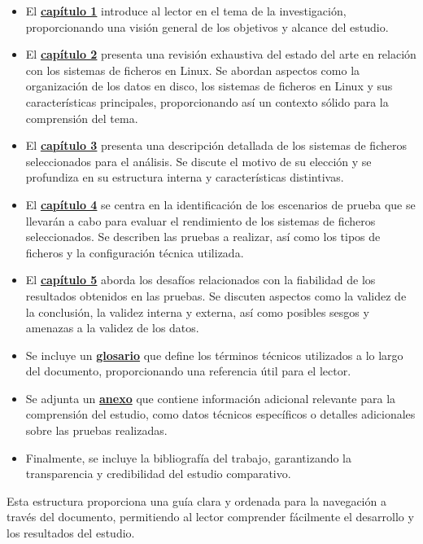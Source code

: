 \begin{itemize}
    \item El \textbf{\hyperref[sec:capítulo_1]{capítulo 1}} introduce al lector en el tema de la investigación, proporcionando una visión general de los objetivos y alcance del estudio.
    
    \item El \textbf{\hyperref[sec:capítulo_2]{capítulo 2}} presenta una revisión exhaustiva del estado del arte en relación con los sistemas de ficheros en Linux. Se abordan aspectos como la organización de los datos en disco, los sistemas de ficheros en Linux y sus características principales, proporcionando así un contexto sólido para la comprensión del tema.
    
    \item El \textbf{\hyperref[sec:capítulo_3]{capítulo 3}} presenta una descripción detallada de los sistemas de ficheros seleccionados para el análisis. Se discute el motivo de su elección y se profundiza en su estructura interna y características distintivas.
    
    \item El \textbf{\hyperref[sec:capítulo_4]{capítulo 4}} se centra en la identificación de los escenarios de prueba que se llevarán a cabo para evaluar el rendimiento de los sistemas de ficheros seleccionados. Se describen las pruebas a realizar, así como los tipos de ficheros y la configuración técnica utilizada.
    
    \item El \textbf{\hyperref[sec:capítulo_5]{capítulo 5}} aborda los desafíos relacionados con la fiabilidad de los resultados obtenidos en las pruebas. Se discuten aspectos como la validez de la conclusión, la validez interna y externa, así como posibles sesgos y amenazas a la validez de los datos.
    
    \item Se incluye un \textbf{\hyperref[sec:glosario]{glosario}} que define los términos técnicos utilizados a lo largo del documento, proporcionando una referencia útil para el lector.
    
    \item Se adjunta un \textbf{\hyperref[sec:anexo]{anexo}} que contiene información adicional relevante para la comprensión del estudio, como datos técnicos específicos o detalles adicionales sobre las pruebas realizadas.
    
    \item Finalmente, se incluye la bibliografía del trabajo, garantizando la transparencia y credibilidad del estudio comparativo.
\end{itemize}

Esta estructura proporciona una guía clara y ordenada para la navegación a través del documento, permitiendo al lector comprender fácilmente el desarrollo y los resultados del estudio.
